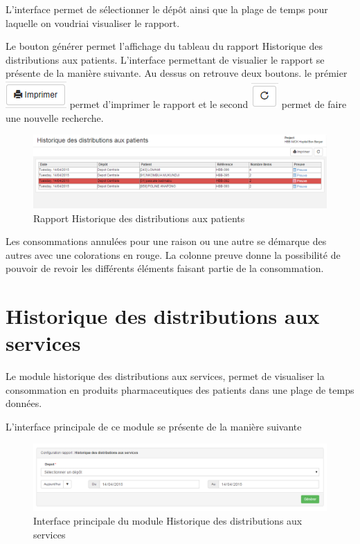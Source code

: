 \documentclass[12pt,a4paper]{report}
\begin{document}
L'interface permet de sélectionner le dépôt ainsi que la plage de temps pour laquelle on voudriai visualiser le rapport. 

Le bouton générer permet l'affichage du tableau du rapport Historique des distributions aux patients.
L'interface permettant de visualier le rapport se présente de la manière suivante. Au dessus on retrouve deux boutons. le prémier 
\includegraphics[scale=0.7]{pic/Print.png} permet d'imprimer le rapport et le second \includegraphics[scale=0.7]{pic/refresh.png} permet de faire une nouvelle recherche.

\begin{figure}[h]
\begin{center}
\includegraphics[width=14cm]{pic/TabHistDistPatient.png}
\end{center}
\caption{Rapport Historique des distributions aux patients}
\label{Rapport Historique des distributions aux patients}
\end{figure}

Les consommations annulées pour une raison ou une autre se démarque des autres avec une colorations en rouge. La colonne preuve donne la possibilité de pouvoir de revoir les différents éléments faisant partie de la consommation.

\newpage
\section{Historique des distributions aux services}
Le module historique des distributions aux services, permet de visualiser la consommation en produits pharmaceutiques des patients dans une plage de temps données.

L'interface principale de ce module se présente de la manière suivante

\begin{figure}[h]
\begin{center}
\includegraphics[width=14cm]{pic/HistDistServices1.png}
\end{center}
\caption{Interface principale du module Historique des distributions aux services}
\label{Interface principale du module Historique des distributions aux services}
\end{figure}
\end{document}
